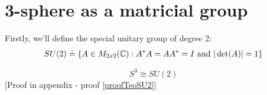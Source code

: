\section{3-sphere as a matricial group}
%
%
%
%
%
%
%

Firstly, we'll define the special unitary group of degree 2:
\begin{equation*}
 SU(2) \doteq \{ A \in M_{2x2}(\mathbb{C}) : A^{*}A = AA^{*} = I \text{ and }|\det(A)| = 1 \}
\end{equation*}

\begin{teorema}
\begin{equation*}
    S^{3} \cong SU(2)
\end{equation*}
[Proof in appendix - proof \ref{proofTeoSU2}]
\end{teorema}


